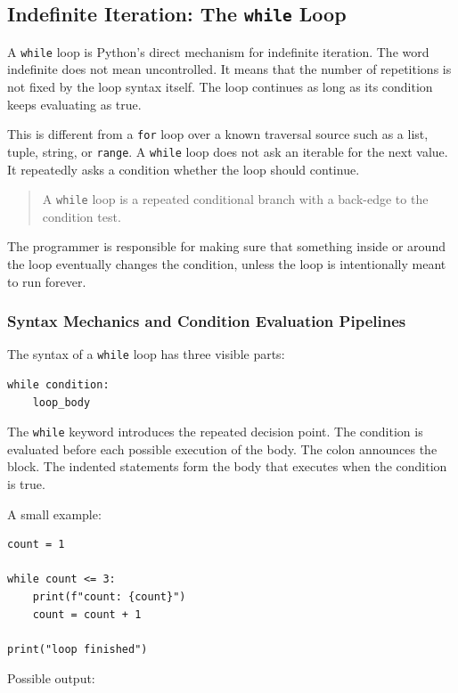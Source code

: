 \subsection{Indefinite Iteration: The \texttt{while} Loop}

A \texttt{while} loop is Python's direct mechanism for indefinite iteration. The word indefinite does not mean uncontrolled. It means that the number of repetitions is not fixed by the loop syntax itself. The loop continues as long as its condition keeps evaluating as true.

This is different from a \texttt{for} loop over a known traversal source such as a list, tuple, string, or \texttt{range}. A \texttt{while} loop does not ask an iterable for the next value. It repeatedly asks a condition whether the loop should continue.

\begin{quote}
A \texttt{while} loop is a repeated conditional branch with a back-edge to the condition test.
\end{quote}

The programmer is responsible for making sure that something inside or around the loop eventually changes the condition, unless the loop is intentionally meant to run forever.

\subsubsection{Syntax Mechanics and Condition Evaluation Pipelines}

The syntax of a \texttt{while} loop has three visible parts:

\begin{verbatim}
while condition:
    loop_body
\end{verbatim}

The \texttt{while} keyword introduces the repeated decision point. The condition is evaluated before each possible execution of the body. The colon announces the block. The indented statements form the body that executes when the condition is true.

A small example:

\begin{verbatim}
count = 1

while count <= 3:
    print(f"count: {count}")
    count = count + 1

print("loop finished")
\end{verbatim}

Possible output:


